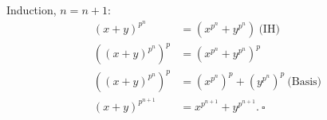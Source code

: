 \documentclass{article}
\begin{document}
Induction, $n=n+1$:
\begin{equation*}
\begin{aligned}
(x+y)^{p^{n}} &= (x^{p^n}+y^{p^n})~\text{(IH)} \\
((x+y)^{p^{n}})^p &= (x^{p^n}+y^{p^n})^p \\
((x+y)^{p^{n}})^p &= (x^{p^n})^p+(y^{p^n})^p~\text{(Basis)}\\
(x+y)^{p^{n+1}} &= x^{p^{n+1}}+y^{p^{n+1}}.~\square\\
\end{aligned}
\end{equation*}
\end{document}
